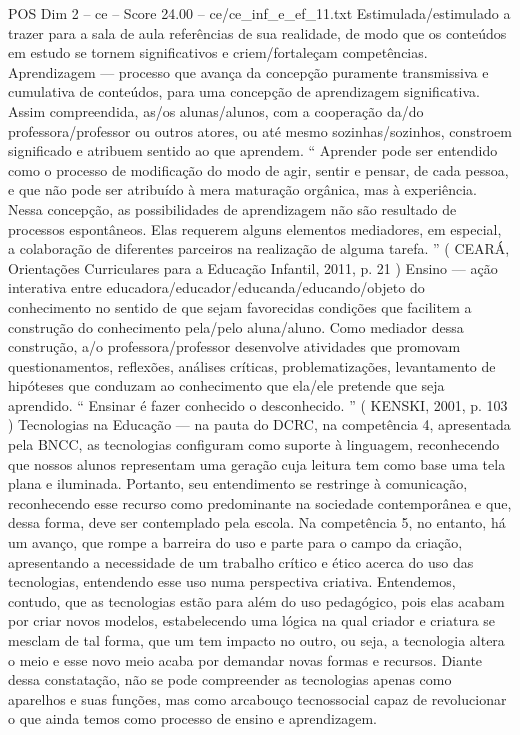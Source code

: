 \begin{textsample}{POS Dim 2 – ce – Score 24.00 – ce/ce\_inf\_e\_ef\_11.txt}
Estimulada/estimulado a trazer para a sala de aula referências de sua realidade, de modo que os conteúdos em estudo se tornem significativos e criem/fortaleçam competências.
Aprendizagem — processo que avança da concepção puramente transmissiva e cumulativa de conteúdos, para uma concepção de aprendizagem significativa.
Assim compreendida, as/os alunas/alunos, com a cooperação da/do professora/professor ou outros atores, ou até mesmo sozinhas/sozinhos, constroem significado e atribuem sentido ao que aprendem. “ Aprender pode ser entendido como o processo de modificação do modo de agir, sentir e pensar, de cada pessoa, e que não pode ser atribuído à mera maturação orgânica, mas à experiência.
Nessa concepção, as possibilidades de aprendizagem não são resultado de processos espontâneos.
Elas requerem alguns elementos mediadores, em especial, a colaboração de diferentes parceiros na realização de alguma tarefa. ” ( CEARÁ, Orientações Curriculares para a Educação Infantil, 2011, p. 21 ) Ensino — ação interativa entre educadora/educador/educanda/educando/objeto do conhecimento no sentido de que sejam favorecidas condições que facilitem a construção do conhecimento pela/pelo aluna/aluno.
Como mediador dessa construção, a/o professora/professor desenvolve atividades que promovam questionamentos, reflexões, análises críticas, problematizações, levantamento de hipóteses que conduzam ao conhecimento que ela/ele pretende que seja aprendido. “ Ensinar é fazer conhecido o desconhecido. ” ( KENSKI, 2001, p. 103 ) Tecnologias na Educação — na pauta do DCRC, na competência 4, apresentada pela BNCC, as tecnologias configuram como suporte à linguagem, reconhecendo que nossos alunos representam uma geração cuja leitura tem como base uma tela plana e iluminada.
Portanto, seu entendimento se restringe à comunicação, reconhecendo esse recurso como predominante na sociedade contemporânea e que, dessa forma, deve ser contemplado pela escola.
Na competência 5, no entanto, há um avanço, que rompe a barreira do uso e parte para o campo da criação, apresentando a necessidade de um trabalho crítico e ético acerca do uso das tecnologias, entendendo esse uso numa perspectiva criativa.
Entendemos, contudo, que as tecnologias estão para além do uso pedagógico, pois elas acabam por criar novos modelos, estabelecendo uma lógica na qual criador e criatura se mesclam de tal forma, que um tem impacto no outro, ou seja, a tecnologia altera o meio e esse novo meio acaba por demandar novas formas e recursos.
Diante dessa constatação, não se pode compreender as tecnologias apenas como aparelhos e suas funções, mas como arcabouço tecnossocial capaz de revolucionar o que ainda temos como processo de ensino e aprendizagem.

\end{textsample}
